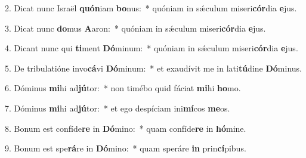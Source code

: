 
2. Dicat nunc Israël \textbf{quón}iam \textbf{bo}nus:~* quóniam in s\'{\ae}culum miseri\textbf{cór}dia \textbf{e}jus.

3. Dicat nunc \textbf{do}mus \textbf{A}aron:~* quóniam in s\'{\ae}culum miseri\textbf{cór}dia \textbf{e}jus.

4. Dicant nunc qui \textbf{ti}ment \textbf{Dó}minum:~* quóniam in s\'{\ae}culum miseri\textbf{cór}dia \textbf{e}jus.

5. De tribulatióne invo\textbf{cá}vi \textbf{Dó}minum:~* et exaudívit me in lati\textbf{tú}dine \textbf{Dó}minus.

6. Dóminus \textbf{mi}hi ad\textbf{jú}tor:~* non timébo quid fáciat \textbf{mi}hi \textbf{ho}mo.

7. Dóminus \textbf{mi}hi ad\textbf{jú}tor:~* et ego despíciam ini\textbf{mí}cos \textbf{me}os.

8. Bonum est confíde\textbf{re} in \textbf{Dó}mino:~* quam confíde\textbf{re} in \textbf{hó}mine.

9. Bonum est spe\textbf{rá}re in \textbf{Dó}mino:~* quam speráre \textbf{in} prin\textbf{cí}pibus.

